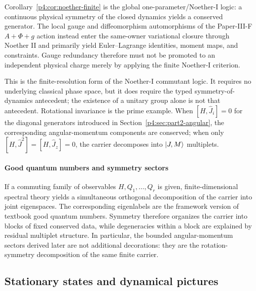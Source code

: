 \documentclass[12pt,a4paper]{article}
\begin{document}
\begin{remark}
\label{p4:rem:v176-noether-one-two-boundary}
Corollary~\ref{p4:cor:noether-finite} is the global one-parameter/Noether-I
logic: a continuous physical symmetry of the closed dynamics yields a
conserved generator.  The local gauge and diffeomorphism automorphisms of the
Paper-III-F \(A+\Phi+g\) action instead enter the same-owner variational
closure through Noether II and primarily yield Euler--Lagrange identities,
moment maps, and constraints.  Gauge redundancy therefore must not be
promoted to an independent physical charge merely by applying the finite
Noether-I criterion.
\end{remark}

This is the finite-resolution form of the Noether-I commutant logic.  It
requires no underlying classical phase space, but it does require the typed
symmetry-of-dynamics antecedent; the existence of a unitary group alone is not
that antecedent.  Rotational invariance is the prime example.  When
\([H,\hat J_i]=0\) for the diagonal generators introduced in
Section~\ref{p4:sec:part2-angular}, the corresponding angular-momentum
components are conserved; when only
\([H,\hat J^2]=[H,\hat J_z]=0\), the carrier decomposes into
\(\lvert J,M \rangle\) multiplets.



\paragraph{Good quantum numbers and symmetry sectors}
\label{p4:sec:part2-good-quantum-numbers}

If a commuting family of observables \(H,Q_1,\dots,Q_r\) is given, finite-dimensional spectral theory yields a simultaneous orthogonal decomposition of the carrier into joint eigenspaces.
The corresponding eigenlabels are the framework version of textbook good quantum numbers.
Symmetry therefore organizes the carrier into blocks of fixed conserved data, while degeneracies within a block are explained by residual multiplet structure.
In particular, the bounded angular-momentum sectors derived later are not additional decorations: they are the rotation-symmetry decomposition of the same finite carrier.




\subsection{Stationary states and dynamical pictures}
\label{p4:sec:part2-dynamical-pictures}
\end{document}
